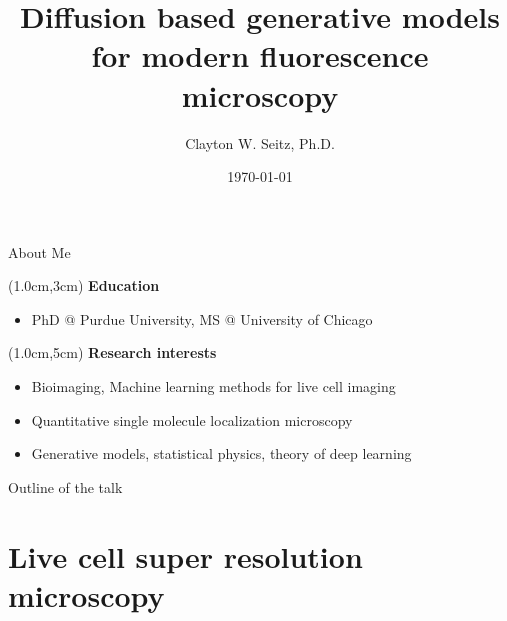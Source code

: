 \documentclass{beamer}					%
\title{Diffusion based generative models for modern fluorescence microscopy}	%
\author{Clayton W. Seitz, Ph.D.}								%
\date{\today}									%
\begin{document}
\begin{frame}
  \titlepage
\end{frame}


%


\begin{frame}{About Me}

\begin{textblock*}{10cm}(1.0cm,3cm)
\textbf{Education}
\begin{itemize}
\item PhD @ Purdue University, MS @ University of Chicago
\end{itemize}
\end{textblock*}

\begin{textblock*}{10cm}(1.0cm,5cm)
\textbf{Research interests}
\begin{itemize}
\item Bioimaging, Machine learning methods for live cell imaging
\item Quantitative single molecule localization microscopy 
\item Generative models, statistical physics, theory of deep learning
\end{itemize}
\end{textblock*}

\end{frame}

\begin{frame}{Outline of the talk}
    \tableofcontents
\end{frame}


\section{Live cell super resolution microscopy}
\end{document}
